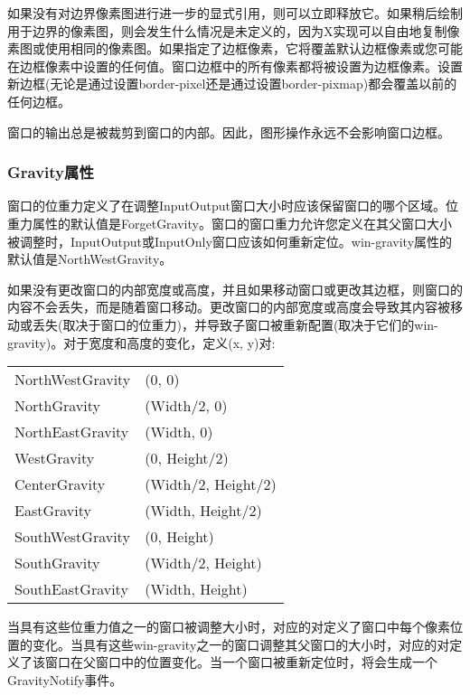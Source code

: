 如果没有对边界像素图进行进一步的显式引用，则可以立即释放它。如果稍后绘制用于边界的像素图，则会发生什么情况是未定义的，因为X实现可以自由地复制像素图或使用相同的像素图。如果指定了边框像素，它将覆盖默认边框像素或您可能在边框像素中设置的任何值。窗口边框中的所有像素都将被设置为边框像素。设置新边框(无论是通过设置border-pixel还是通过设置border-pixmap)都会覆盖以前的任何边框。

窗口的输出总是被裁剪到窗口的内部。因此，图形操作永远不会影响窗口边框。

\subsubsection{Gravity属性}

窗口的位重力定义了在调整InputOutput窗口大小时应该保留窗口的哪个区域。位重力属性的默认值是ForgetGravity。窗口的窗口重力允许您定义在其父窗口大小被调整时，InputOutput或InputOnly窗口应该如何重新定位。win-gravity属性的默认值是NorthWestGravity。

如果没有更改窗口的内部宽度或高度，并且如果移动窗口或更改其边框，则窗口的内容不会丢失，而是随着窗口移动。更改窗口的内部宽度或高度会导致其内容被移动或丢失(取决于窗口的位重力)，并导致子窗口被重新配置(取决于它们的win-gravity)。对于宽度和高度的变化，定义(x, y)对:

\begin{center}
	\begin{supertabular}{|l|l|}
		NorthWestGravity & (0, 0) \\
		NorthGravity & (Width/2, 0) \\
		NorthEastGravity & (Width, 0) \\
		WestGravity & (0, Height/2) \\
		CenterGravity & (Width/2, Height/2) \\
		EastGravity & (Width, Height/2) \\
		SouthWestGravity & (0, Height) \\
		SouthGravity & (Width/2, Height) \\
		SouthEastGravity & (Width, Height) \\
		\hline
	\end{supertabular}
\end{center}

当具有这些位重力值之一的窗口被调整大小时，对应的对定义了窗口中每个像素位置的变化。当具有这些win-gravity之一的窗口调整其父窗口的大小时，对应的对定义了该窗口在父窗口中的位置变化。当一个窗口被重新定位时，将会生成一个GravityNotify事件。

